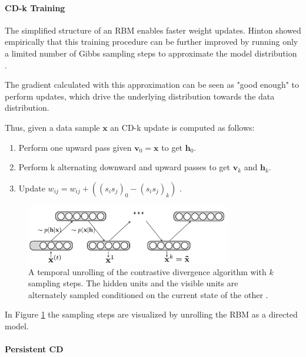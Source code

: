 \paragraph{CD-k Training} \label{c:cdk}

The simplified structure of an RBM enables faster weight updates. 
Hinton showed empirically that this training procedure can be further improved by running only a limited number of Gibbs sampling steps to approximate the model distribution \cite{hinton2002training}.

The gradient calculated with this approximation can be seen as "good enough" to perform updates, which drive the underlying distribution towards the data distribution.

Thus, given a data sample $\textbf{x}$ an CD-k update is computed as follows:
\begin{enumerate}
\item Perform one upward pass given $\textbf{v}_0=\textbf{x}$ to get $\textbf{h}_0$.
\item Perform k alternating downward and upward passes to get $\textbf{v}_k$ and $\textbf{h}_k$.
\item Update $w_{ij} = w_{ij} + ( (s_i s_j)_0 - (s_i s_j)_k ) $ .
\end{enumerate} 

\begin{figure}
	\centering
    	\includegraphics[width=0.8\textwidth]{imgs/cd.png} 
    \caption[A temporal unrolling of the contrastive divergence algorithm.]{A temporal unrolling of the contrastive divergence algorithm with $k$ sampling steps. The hidden units and the visible units are alternately sampled conditioned on the current state of the other \cite{cdImg}.}
	\label{fig:cd}
\end{figure}

In Figure \ref{fig:cd} the sampling steps are visualized by unrolling the RBM as a directed model.

\paragraph{Persistent CD} \label{c:pcd}

